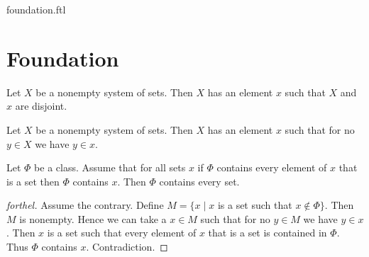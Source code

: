\documentclass{naproche-library}
\begin{document}
\begin{smodule}{foundation.ftl}

  \section{Foundation}

  \begin{axiom}[forthel,title=Foundation,id=FOUNDATIONS_10_1320008569323520,printid]
    Let $X$ be a nonempty system of sets.
    Then $X$ has an element $x$ such that $X$ and $x$ are disjoint.
  \end{axiom}
  
  \begin{corollary}[forthel,id=FOUNDATIONS_10_9532145874510315,printid]
    Let $X$ be a nonempty system of sets.
    Then $X$ has an element $x$ such that for no $y \in X$ we have $y \in x$.
  \end{corollary}
  
  \begin{proposition}[forthel,id=FOUNDATIONS_11_2812087589928960,printid]
    Let $\Phi$ be a class.
    Assume that for all sets $x$ if $\Phi$ contains every element of $x$ that is a set then $\Phi$ contains $x$.
    Then $\Phi$ contains every set.
  \end{proposition}
  \begin{proof}[forthel]
    Assume the contrary.
    Define $M = \{ x \mid x$ is a set such that $x \notin \Phi \}$.
    Then $M$ is nonempty.
    Hence we can take a $x \in M$ such that for no $y \in M$ we have $y \in x$.
    Then $x$ is a set such that every element of $x$ that is a set is contained in $\Phi$.
    Thus $\Phi$ contains $x$.
    Contradiction.
  \end{proof}
\end{smodule}
\end{document}
